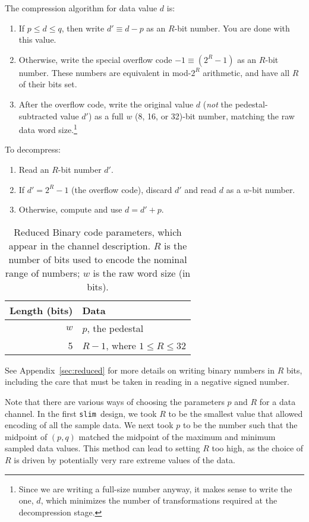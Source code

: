 \documentclass[11pt]{article}
\newcommand{\slim}{{\tt slim}}
\begin{document}
The compression algorithm for data value $d$ is:
\begin{enumerate}
\item If $p\le d \le q$, then write $d'\equiv d-p$ as an $R$-bit
  number.  You are done with this value.
\item Otherwise, write the special overflow code $-1\equiv(2^R-1)$
  as an $R$-bit number.  These numbers are equivalent in mod-$2^R$
  arithmetic, and have all $R$ of their bits set.
\item After the overflow code, write the original value $d$
  (\emph{not} the pedestal-subtracted value $d'$) as a full $w$ (8, 16,
  or 32)-bit number, matching the raw data word size.\footnote{Since we
  are writing a full-size number anyway, it makes sense to write the
  one, $d$, which minimizes the number of transformations required at
  the decompression stage.}
\end{enumerate}

To decompress:
\begin{enumerate}
\item Read an $R$-bit number $d'$.
\item If $d'=2^R-1$ (the overflow code), discard $d'$ and read $d$
  as a $w$-bit number.
\item Otherwise, compute and use $d=d'+p$.
\end{enumerate}

\begin{table}[th]
  \centering
  \begin{tabular}{rl}
    Length (bits) & Data \\ \hline
    $w$ & $p$, the pedestal \\
    5 & $R-1$, where $1\le R\le 32$\\
  \end{tabular}
  \caption{
    \label{tab:red_bin_param}
    Reduced Binary code parameters, which appear in the channel
    description.  $R$ is the number of bits used to encode the nominal
    range of numbers; $w$ is the raw word size (in bits).}
\end{table}

See Appendix~\ref{sec:reduced} for more details on writing
binary numbers in  $R$ bits, including the care that must be taken in
reading in a negative signed number.

Note that there are various ways of choosing the parameters $p$ and $R$
for a data channel.  In the first \slim\ design, we took $R$ to be the
smallest value that allowed encoding of all the sample data.  We next
took $p$ to be the number such that the midpoint of $(p,q)$ matched
the midpoint of the maximum and minimum sampled data values.  This
method can lead to setting $R$ too high, as the choice of $R$ is
driven by potentially very rare extreme values of the data.
\end{document}
